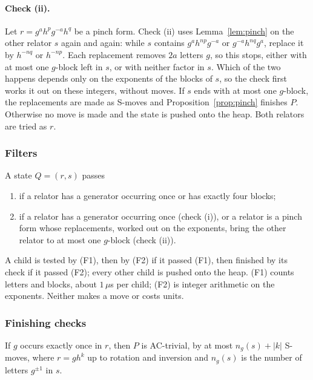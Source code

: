 \paragraph{Check (ii).} Let $r=g^ah^pg^{-a}h^q$ be a pinch form. Check (ii) uses Lemma~\ref{lem:pinch} on the other
relator $s$ again and again: while $s$ contains $g^ah^{np}g^{-a}$ or $g^{-a}h^{nq}g^a$, replace it by $h^{-nq}$ or
$h^{-np}$. Each replacement removes $2a$ letters $g$, so this stops, either with at most one $g$-block left in $s$, or
with neither factor in $s$. Which of the two happens depends only on the exponents of the blocks of $s$, so the check
first works it out on these integers, without moves. If $s$ ends with at most one $g$-block, the replacements are
made as S-moves and Proposition~\ref{prop:pinch} finishes $P$. Otherwise no move is made and the state is pushed onto
the heap. Both relators are tried as $r$.

\subsubsection{Filters}

\begin{definition}[Filters]\label{def:filters}
A state $Q=(r,s)$ passes
\begin{enumerate}
  \item[(F1)] if a relator has a generator occurring once or has exactly four blocks;
  \item[(F2)] if a relator has a generator occurring once (check (i)), or a relator is a pinch form whose
  replacements, worked out on the exponents, bring the other relator to at most one $g$-block (check (ii)).
\end{enumerate}
\end{definition}

A child is tested by (F1), then by (F2) if it passed (F1), then finished by its check if it passed (F2); every other
child is pushed onto the heap. (F1) counts letters and blocks, about $1\,\mu$s per child; (F2) is integer arithmetic
on the exponents. Neither makes a move or costs units.

\subsubsection{Finishing checks}

\begin{proposition}\label{prop:once}
If $g$ occurs exactly once in $r$, then $P$ is AC-trivial, by at most $n_g(s)+|k|$ S-moves, where $r=gh^k$ up to
rotation and inversion and $n_g(s)$ is the number of letters $g^{\pm1}$ in $s$.
\end{proposition}

